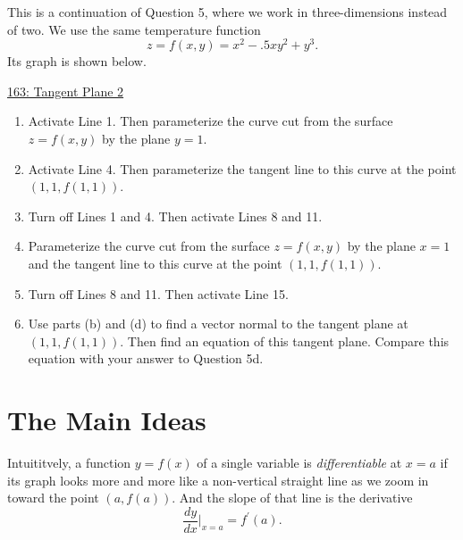 \documentclass{ximera}
\begin{document}
\begin{question} \label{QKnDe2111}
This is a continuation of Question 5, where we work in three-dimensions instead of two. We use the same temperature function
\[
    z =f(x,y) = x^{2}-.5xy^{2}+y^{3} .
\]
Its graph is shown below.

\begin{onlineOnly}
    \begin{center}
\end{center}
\end{onlineOnly}

\href{https://www.desmos.com/3d/4urebwqtmk}{163: Tangent Plane 2}

\begin{enumerate}
\item Activate Line 1. Then parameterize the curve cut from the surface $z=f(x,y)$ by the plane $y=1$.

\item Activate Line 4. Then parameterize the tangent line to this curve at the point $(1,1,f(1,1))$.

\item Turn off Lines 1 and 4. Then activate Lines 8 and 11. 

\item Parameterize the curve cut from the surface $z=f(x,y)$ by the plane $x=1$ and the tangent line to this curve at the point $(1,1,f(1,1))$.

\item Turn off Lines 8 and 11. Then activate Line 15.

\item Use parts (b) and (d) to find a vector normal to the tangent plane at $(1,1,f(1,1))$. Then find an equation of this tangent plane. Compare this equation with your answer to Question 5d. 
\end{enumerate}

\end{question}



\section{The Main Ideas}

Intuititvely, a function $y=f(x)$ of a single variable is \emph{differentiable} at $x=a$ if its graph looks more and more like a non-vertical straight line as we zoom in toward the point $(a,f(a))$. And the slope of that line is the derivative 
\[
   \frac{dy}{dx}\Big|_{x=a} = f^\prime(a).
\]
\end{document}
